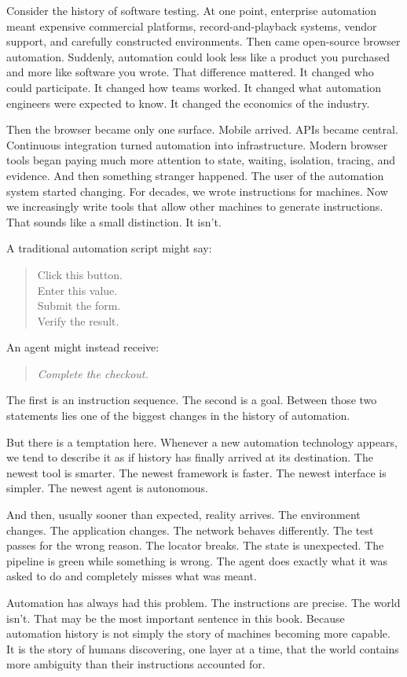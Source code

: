 \documentclass[11pt,twoside]{book}
\begin{document}
Consider the history of software testing.
At one point, enterprise automation meant expensive commercial platforms, record-and-playback systems, vendor support, and carefully constructed environments.
Then came open-source browser automation.
Suddenly, automation could look less like a product you purchased and more like software you wrote.
That difference mattered.
It changed who could participate. It changed how teams worked. It changed what automation engineers were expected to know. It changed the economics of the industry.

Then the browser became only one surface.
Mobile arrived.
APIs became central.
Continuous integration turned automation into infrastructure.
Modern browser tools began paying much more attention to state, waiting, isolation, tracing, and evidence.
And then something stranger happened.
The user of the automation system started changing.
For decades, we wrote instructions for machines.
Now we increasingly write tools that allow other machines to generate instructions.
That sounds like a small distinction.
It isn't.

A traditional automation script might say:
\begin{quote}
Click this button.\\
Enter this value.\\
Submit the form.\\
Verify the result.
\end{quote}
An agent might instead receive:
\begin{quote}
\emph{Complete the checkout.}
\end{quote}
The first is an instruction sequence.
The second is a goal.
Between those two statements lies one of the biggest changes in the history of automation.

But there is a temptation here.
Whenever a new automation technology appears, we tend to describe it as if history has finally arrived at its destination.
The newest tool is smarter.
The newest framework is faster.
The newest interface is simpler.
The newest agent is autonomous.

And then, usually sooner than expected, reality arrives.
The environment changes.
The application changes.
The network behaves differently.
The test passes for the wrong reason.
The locator breaks.
The state is unexpected.
The pipeline is green while something is wrong.
The agent does exactly what it was asked to do and completely misses what was meant.

Automation has always had this problem.
The instructions are precise. The world isn't.
That may be the most important sentence in this book.
Because automation history is not simply the story of machines becoming more capable.
It is the story of humans discovering, one layer at a time, that the world contains more ambiguity than their instructions accounted for.
\end{document}
